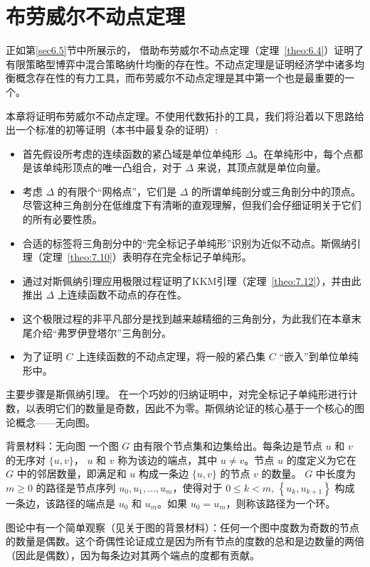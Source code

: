 \chapter{布劳威尔不动点定理}\label{chap:7}

正如第\ref{sec6.5}节中所展示的，\citet{nash1951} 借助布劳威尔不动点定理（定理~\ref{theo:6.4}）证明了有限策略型博弈中混合策略纳什均衡的存在性。不动点定理是证明经济学中诸多均衡概念存在性的有力工具，而布劳威尔不动点定理是其中第一个也是最重要的一个。

本章将证明布劳威尔不动点定理。不使用代数拓扑的工具，我们将沿着以下思路给出一个标准的初等证明（本书中最复杂的证明）:
\begin{itemize}
\item 首先假设所考虑的连续函数的紧凸域是单位单纯形 \(\Delta\)。在单纯形中，每个点都是该单纯形顶点的唯一凸组合，对于 \(\Delta\) 来说，其顶点就是单位向量。
\item 考虑 \(\Delta\) 的有限个“网格点”，它们是 \(\Delta\) 的所谓单纯剖分或三角剖分中的顶点。尽管这种三角剖分在低维度下有清晰的直观理解，但我们会仔细证明关于它们的所有必要性质。
\item 合适的标签将三角剖分中的“完全标记子单纯形”识别为近似不动点。斯佩纳引理（定理~\ref{theo:7.10}）表明存在完全标记子单纯形。
\item \citet*{knaster1929} 通过对斯佩纳引理应用极限过程证明了KKM引理（定理~\ref{theo:7.12}），并由此推出 \(\Delta\) 上连续函数不动点的存在性。
\item 这个极限过程的非平凡部分是找到越来越精细的三角剖分，为此我们在本章末尾介绍“弗罗伊登塔尔”三角剖分。
\item 为了证明 \(C\) 上连续函数的不动点定理，将一般的紧凸集 \(C\) “嵌入”到单位单纯形中。
\end{itemize}

主要步骤是斯佩纳引理。\citet{sperner1928} 在一个巧妙的归纳证明中，对完全标记子单纯形进行计数，以表明它们的数量是奇数，因此不为零。斯佩纳论证的核心基于一个核心的图论概念——无向图。
\begin{mybox}{背景材料：无向图}
一个图 \(G\) 由有限个节点集和边集给出。每条边是节点 \(u\) 和 \(v\) 的无序对 \(\{ u,v\}\)， \(u\) 和 \(v\) 称为该边的端点，其中 \(u \neq  v\)。节点 \(u\) 的度定义为它在 \(G\) 中的邻居数量，即满足和 $u$ 构成一条边 \(\{ u,v\}\)  的节点 \(v\) 的数量。 \(G\) 中长度为 \(m \geq  0\) 的路径是节点序列 \({u}_{0},{u}_{1},\ldots,{u}_{m}\)，使得对于 \(0 \leq  k < m\), \(\left\{  {{u}_{k},{u}_{k + 1}}\right\}\) 构成一条边，该路径的端点是 \({u}_{0}\) 和 \({u}_{m}\)。如果 \({u}_{0} = {u}_{m}\)，则称该路径为一个环。
\end{mybox}
图论中有一个简单观察（见关于图的背景材料）：任何一个图中度数为奇数的节点的数量是偶数。这个奇偶性论证成立是因为所有节点的度数的总和是边数量的两倍（因此是偶数），因为每条边对其两个端点的度都有贡献。

